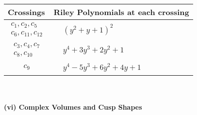 \documentclass[1p]{elsarticle_modified}
\theoremstyle{definition}
\begin{document}
\begin{tabular}{m{50pt}|m{274pt}}
Crossings & \hspace{64pt}Riley Polynomials at each crossing \\
\hline $$\begin{aligned}c_{1},c_{2},c_{5}\\c_{6},c_{11},c_{12}\end{aligned}$$&$\begin{aligned}
&(y^2+y+1)^2
\end{aligned}$\\
\hline $$\begin{aligned}c_{3},c_{4},c_{7}\\c_{8},c_{10}\end{aligned}$$&$\begin{aligned}
&y^4+3 y^3+2 y^2+1
\end{aligned}$\\
\hline $$\begin{aligned}c_{9}\end{aligned}$$&$\begin{aligned}
&y^4-5 y^3+6 y^2+4 y+1
\end{aligned}$\\
\hline
\end{tabular}\\~\\
\newpage\flushleft \textbf{(vi) Complex Volumes and Cusp Shapes}
\end{document}
